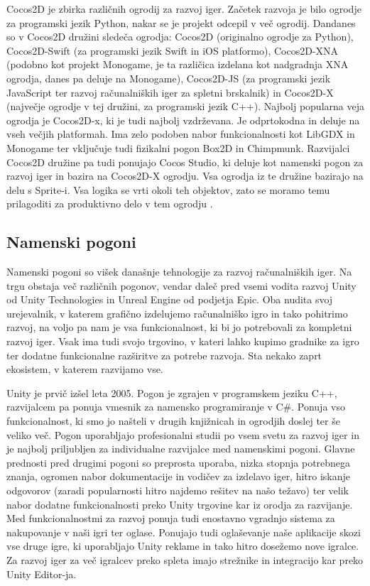 \documentclass[12pt,a4paper,twoside]{book}
\begin{document}
Cocos2D je zbirka različnih ogrodij za razvoj iger. Začetek razvoja je bilo ogrodje za programski jezik Python, nakar se je projekt odcepil v več ogrodij. Dandanes so v Cocos2D družini sledeča ogrodja: Cocos2D (originalno ogrodje za Python), Cocos2D-Swift (za programski jezik Swift in iOS platformo), Cocos2D-XNA (podobno kot projekt Monogame, je ta različica izdelana kot nadgradnja XNA ogrodja, danes pa deluje na Monogame), Cocos2D-JS (za programski jezik JavaScript ter razvoj računalniških iger za spletni brskalnik) in Cocos2D-X (največje ogrodje v tej družini, za programski jezik C++). Najbolj popularna veja ogrodja je Cocos2D-x, ki je tudi najbolj vzdrževana. Je odprtokodna in deluje na vseh večjih platformah. Ima zelo podoben nabor funkcionalnosti kot LibGDX in Monogame ter vključuje tudi fizikalni pogon Box2D in Chimpmunk. Razvijalci Cocos2D družine pa tudi ponujajo Cocos Studio, ki deluje kot namenski pogon za razvoj iger in bazira na Cocos2D-X ogrodju. Vsa ogrodja iz te družine bazirajo na delu s Sprite-i. Vsa logika se vrti okoli teh objektov, zato se moramo temu prilagoditi za produktivno delo v tem ogrodju \cite{cocos2d}\cite{cocos2dx}.

\subsection{Namenski pogoni}
Namenski pogoni so višek današnje tehnologije za razvoj računalniških iger. Na trgu obstaja več različnih pogonov, vendar daleč pred vsemi vodita razvoj Unity od Unity Technologies in Unreal Engine od podjetja Epic. Oba nudita svoj urejevalnik, v katerem grafično izdelujemo računalniško igro in tako pohitrimo razvoj, na voljo pa nam je vsa funkcionalnost, ki bi jo potrebovali za kompletni razvoj iger. Vsak ima tudi svojo trgovino, v kateri lahko kupimo gradnike za igro ter dodatne funkcionalne razširitve za potrebe razvoja. Sta nekako zaprt ekosistem, v katerem razvijamo vse.

Unity je prvič izšel leta 2005. Pogon je zgrajen v programskem jeziku C++, razvijalcem pa ponuja vmesnik za namensko programiranje v C\#. Ponuja vso funkcionalnost, ki smo jo našteli v drugih knjižnicah in ogrodjih doslej ter še veliko več. Pogon uporabljajo profesionalni studii po vsem svetu za razvoj iger in je najbolj priljubljen za individualne razvijalce med namenskimi pogoni. Glavne prednosti pred drugimi pogoni so preprosta uporaba, nizka stopnja potrebnega znanja, ogromen nabor dokumentacije in vodičev za izdelavo iger, hitro iskanje odgovorov (zaradi popularnosti hitro najdemo rešitev na našo težavo) ter velik nabor dodatne funkcionalnosti preko Unity trgovine kar iz orodja za razvijanje. Med funkcionalnostmi za razvoj ponuja tudi enostavno vgradnjo sistema za nakupovanje v naši igri ter oglase. Ponujajo tudi oglaševanje naše aplikacije skozi vse druge igre, ki uporabljajo Unity reklame in tako hitro dosežemo nove igralce. Za razvoj iger za več igralcev preko spleta imajo strežnike in integracijo kar preko Unity Editor-ja.
\end{document}
